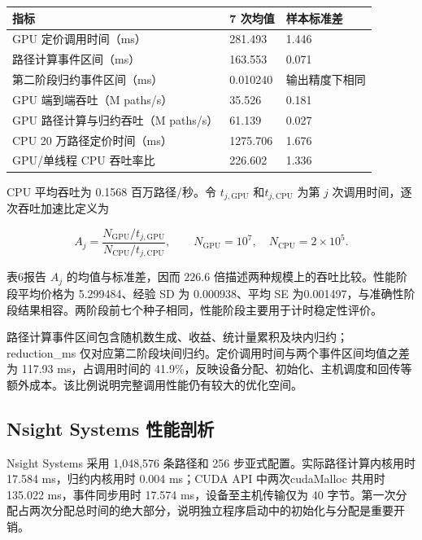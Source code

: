 \documentclass[UTF8,a4paper,zihao=5,fontset=none]{ctexart}
\begin{document}
\par\medskip\noindent\begin{minipage}{\linewidth}
\small
{}\label{tab:6}
\begin{tabular}{@{}P{78.188mm}P{40.658mm}P{37.530mm}@{}}
\toprule
\textbf{指标} & \textbf{7 次均值} & \textbf{样本标准差} \\
\midrule
GPU 定价调用时间（ms） & 281.493 & 1.446 \\
路径计算事件区间（ms） & 163.553 & 0.071 \\
第二阶段归约事件区间（ms） & 0.010240 & 输出精度下相同 \\
GPU 端到端吞吐（M paths/s） & 35.526 & 0.181 \\
GPU 路径计算与归约吞吐（M paths/s） & 61.139 & 0.027 \\
CPU 20 万路径定价时间（ms） & 1275.706 & 1.676 \\
GPU/单线程 CPU 吞吐率比 & 226.602 & 1.336 \\
\bottomrule
\end{tabular}
\end{minipage}\par\medskip

CPU 平均吞吐为 0.1568 百万路径/秒。令 $t_{j,\mathrm{GPU}}$ 和$t_{j,\mathrm{CPU}}$ 为第 $j$ 次调用时间，逐次吞吐加速比定义为


\nopagebreak[4]
\begin{equation}
\label{eq:15}
A_j=\frac{N_{\mathrm{GPU}}/t_{j,\mathrm{GPU}}}
{N_{\mathrm{CPU}}/t_{j,\mathrm{CPU}}},\qquad
N_{\mathrm{GPU}}=10^7,\quad N_{\mathrm{CPU}}=2\times10^5.
\end{equation}

表6报告 $A_j$ 的均值与标准差，因而 $226.6$ 倍描述两种规模上的吞吐比较。性能阶段平均价格为 5.299484、经验 SD 为 0.000938、平均 SE 为0.001497，与准确性阶段结果相容。两阶段前七个种子相同，性能阶段主要用于计时稳定性评价。


路径计算事件区间包含随机数生成、收益、统计量累积及块内归约；{\small\ttfamily reduction\_\allowbreak{}ms} 仅对应第二阶段块间归约。定价调用时间与两个事件区间均值之差为 117.93 ms，占调用时间的 41.9\%，反映设备分配、初始化、主机调度和回传等额外成本。该比例说明完整调用性能仍有较大的优化空间。


\subsection{Nsight Systems 性能剖析}

Nsight Systems 采用 1,048,576 条路径和 256 步亚式配置。实际路径计算内核用时 17.584 ms，归约内核用时 0.004 ms；CUDA API 中两次{\small\ttfamily cudaMalloc} 共用时 135.022 ms，事件同步用时 17.574 ms，设备至主机传输仅为 40 字节。第一次分配占两次分配总时间的绝大部分，说明独立程序启动中的初始化与分配是重要开销。
\end{document}
